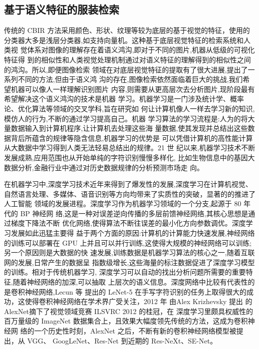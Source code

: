 \subsection{基于语义特征的服装检索}
传统的 CBIR 方法采用颜色、形状、纹理等较为底层的基于视觉的特征，使用的
分类器大多是浅层分类器,如支持向量机。这种基于底层视觉特征的检索系统和人类视
觉体系对图像的理解存在着语义鸿沟,即对于不同的图片,机器从低级的可视化特征得
到的相似性和人类视觉处理机制通过对语义特征的理解得到的相似性之间的鸿沟\cite{卢兴敬2008基于内容的服装图像检索技术研究及实现}。所以,即便图像检索
领域在对底层视觉特征的提取有了很大进展,提出了一系列不同的方法,但由于语义鸿
沟的存在,图像检索依然面临着巨大的挑战,我们希望机器可以像人一样理解识别图片
内容,则需要从更高层次去分析图片,现阶段最有希望解决这个语义鸿沟的技术是机器
学习。机器学习是一门涉及统计学、概率论、优化算法等领域的交叉学科,旨在研究如
何让计算机像人一样去学习新的知识,模仿人的行为,不断的通过学习提高自己。机器
学习算法的学习流程是:人为的将大量数据输入到计算机程序,让计算机去处理这些海
量数据,使其发现并总结出这些数据背后所蕴含的规律等隐含信息,机器学习的优势是
可以凭借计算机的高性能计算从大数据中学习得到人类无法轻易总结出的规律。21 世
纪以来,机器学习技术不断发展成熟,应用范围也从开始单纯的字符识别慢慢多样化,
比如生物信息中的基因大数据分析,金融行业中通过对历史数据规律的分析预测市场走
向。

在机器学习中,深度学习技术近年来得到了爆发性的发展,深度学习在计算机视觉、
自然语言处理、多媒体、语音识别等方向均带来了实质性的突破，显著的的推进了人工智能
领域的发展进程。深度学习作为机器学习领域的一个分支,起源于 80 年代的 BP \cite{rumelhart1988learning}神经网
络,这是一种对误差逆向传播的多层前馈神经网络,其核心思想是通过梯度下降法不断
优化网络,使得算法不断往误差的最小化方向参数调优。深度学习发展如此迅猛主要得
益于两个方面的原因:计算机的计算能力快速发展,神经网络的训练可以部署在 GPU
上并且可以并行训练,这使得大规模的神经网络可以训练;另一个原因则是大数据的快
速发展,训练数据是机器学习算法的核心之一,随着互联网的发展,日常产生的数据呈
指数级增长,这些海量的标注数据促进了深度学习模型的训练。相对于传统机器学习,
深度学习可以自动的找出分析问题所需要的重要特征,随着神经网络的加深,可以抽取
上层次的语义信息。深度网络中比较有代表性的是卷积神经网络,Lecun 等 提出的
LeNet-5\cite{lecun1998gradient} 在手写字符识别的任务上取得很大的成功，这使得卷积神经网络在学术界广受关注，2012
年 由Alex Krizhevsky 提出 的AlexNet\cite{krizhevsky2012imagenet}摘下了视觉领域竞赛 ILSVRC 2012 的桂冠，在
深度学习里颇具权威性的百万量级的 ImageNet\cite{deng2009imagenet} 数据集合上，且效果大幅度领先传统的方法，这成为卷积神经网
络的一个历史性时刻，AlexNet 之后，不断有新的卷积神经网络模型被提出，从 VGG\cite{simonyan2014very}、
GoogLeNet\cite{szegedy2015going}、Res-Net\cite{he2016deep} 到近期的 Res-NeXt\cite{xie2017aggregated}、SE-Net\cite{hu2018squeeze}。

